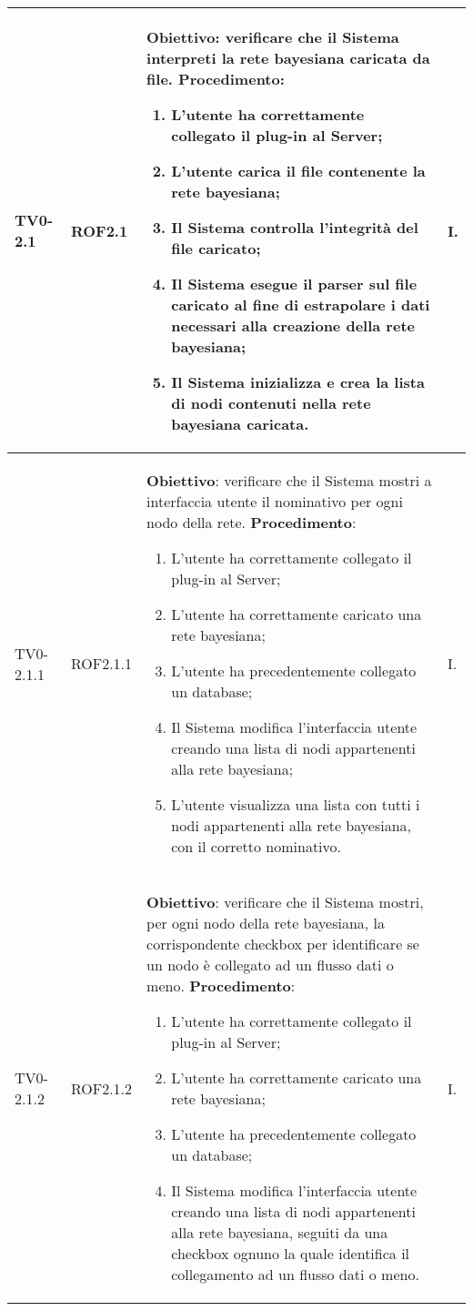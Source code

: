 \begin{longtable}{|C{.15\textwidth}|C{.13\textwidth}|m{.52\textwidth}|C{.08\textwidth}|}
TV0-2.1 & ROF2.1 &
	\textbf{Obiettivo}: verificare che il Sistema interpreti la rete bayesiana caricata da file. \newline
	\textbf{Procedimento}:
	\begin{enumerate}
		\item L'utente ha correttamente collegato il plug-in al Server;
		\item L'utente carica il file contenente la rete bayesiana;
		\item Il Sistema controlla l'integrità del file caricato;
		\item Il Sistema esegue il parser sul file caricato al fine di estrapolare i dati necessari alla creazione della rete bayesiana;
		\item Il Sistema inizializza e crea la lista di nodi contenuti nella rete bayesiana caricata.
	\end{enumerate}
	& I. \\
\hline

TV0-2.1.1 & ROF2.1.1 &
	\textbf{Obiettivo}: verificare che il Sistema mostri a interfaccia utente il nominativo per ogni nodo della rete. \newline
	\textbf{Procedimento}:
	\begin{enumerate}
		\item L'utente ha correttamente collegato il plug-in al Server;
		\item L'utente ha correttamente caricato una rete bayesiana;
		\item L'utente ha precedentemente collegato un database;
		\item Il Sistema modifica l'interfaccia utente creando una lista di nodi appartenenti alla rete bayesiana;
		\item L'utente visualizza una lista con tutti i nodi appartenenti alla rete bayesiana, con il corretto nominativo.
	\end{enumerate}
	& I. \\
\hline

TV0-2.1.2 & ROF2.1.2&
	\textbf{Obiettivo}: verificare che il Sistema mostri, per ogni nodo della rete bayesiana, la corrispondente checkbox per identificare se un nodo è collegato ad un flusso dati o meno. \newline
	\textbf{Procedimento}:
	\begin{enumerate}
		\item L'utente ha correttamente collegato il plug-in al Server;
		\item L'utente ha correttamente caricato una rete bayesiana;
		\item L'utente ha precedentemente collegato un database;
		\item Il Sistema modifica l'interfaccia utente creando una lista di nodi appartenenti alla rete bayesiana, seguiti da una checkbox ognuno la quale identifica il collegamento ad un flusso dati o meno.
	\end{enumerate}
	& I. \\
\hline


\end{longtable}
